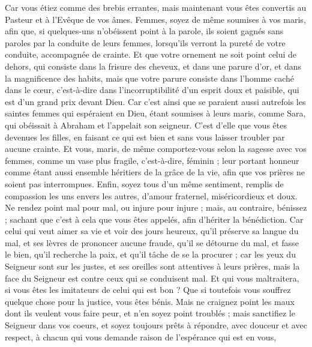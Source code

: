 \begin{multicols}{2}
Car vous étiez comme des brebis errantes, mais maintenant vous êtes convertis au Pasteur et à l'Evêque de vos âmes. 
\VerseOne{}Femmes, soyez de même soumises à vos maris, afin que, si quelques-uns n'obéissent point à la parole, ils soient gagnés sans paroles par la conduite de leurs femmes,
lorsqu'ils verront la pureté de votre conduite, accompagnée de crainte.
Et que votre ornement ne soit point celui de dehors, qui consiste dans la frisure des cheveux, et dans une parure d'or, et dans la magnificence des habits,
mais que votre parure consiste dans l’homme caché dans le cœur, c’est-à-dire dans l’incorruptibilité d’un esprit doux et paisible, qui est d’un grand prix devant Dieu.
Car c'est ainsi que se paraient aussi autrefois les saintes femmes qui espéraient en Dieu, étant soumises à leurs maris,
comme Sara, qui obéissait à Abraham et l'appelait son seigneur. C'est d'elle que vous êtes devenues les filles, en faisant ce qui est bien et sans vous laisser troubler par aucune crainte.
Et vous, maris, de même comportez-vous selon la sagesse avec vos femmes, comme un vase plus fragile, c'est-à-dire, féminin ; leur portant honneur comme étant aussi ensemble héritiers de la grâce de la vie, afin que vos prières ne soient pas interrompues. 
Enfin, soyez tous d'un même sentiment, remplis de compassion les uns envers les autres, d'amour fraternel, miséricordieux et doux.
Ne rendez point mal pour mal, ou injure pour injure ; mais, au contraire, bénissez ; sachant que c'est à cela que vous êtes appelés, afin d'hériter la bénédiction.
Car celui qui veut aimer sa vie et voir des jours heureux, qu'il préserve sa langue du mal, et ses lèvres de prononcer aucune fraude,
qu'il se détourne du mal, et fasse le bien, qu'il recherche la paix, et qu'il tâche de se la procurer ;
car les yeux du Seigneur sont sur les justes, et ses oreilles sont attentives à leurs prières, mais la face du Seigneur est contre ceux qui se conduisent mal.
Et qui vous maltraitera, si vous êtes les imitateurs de celui qui est bon ?
Que si toutefois vous souffrez quelque chose pour la justice, vous êtes bénis. Mais ne craignez point les maux dont ils veulent vous faire peur, et n'en soyez point troublés ;
mais sanctifiez le Seigneur dans vos coeurs, et soyez toujours prêts à répondre, avec douceur et avec respect, à chacun qui vous demande raison de l'espérance qui est en vous, 

\end{multicols}
